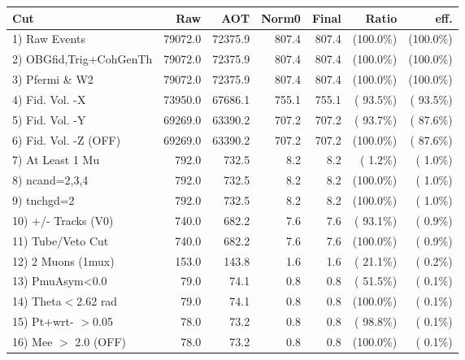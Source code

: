  \begin{table}[h!]\centering
 \begin{tabular}{||l||r|r|r|r|r|r||}
 \hline
 \hline
 Cut & Raw & AOT & Norm0 & Final & Ratio & eff.       \\
 \hline
  1) Raw Events           &      79072.0 &      72375.9 &        807.4 &        807.4 & (100.0\%) & (100.0\%) \\
  2) OBGfid,Trig+CohGenTh &      79072.0 &      72375.9 &        807.4 &        807.4 & (100.0\%) & (100.0\%) \\
  3) Pfermi \& W2         &      79072.0 &      72375.9 &        807.4 &        807.4 & (100.0\%) & (100.0\%) \\
  4) Fid. Vol. -X         &      73950.0 &      67686.1 &        755.1 &        755.1 & ( 93.5\%) & ( 93.5\%) \\
  5) Fid. Vol. -Y         &      69269.0 &      63390.2 &        707.2 &        707.2 & ( 93.7\%) & ( 87.6\%) \\
  6) Fid. Vol. -Z (OFF)   &      69269.0 &      63390.2 &        707.2 &        707.2 & (100.0\%) & ( 87.6\%) \\
  7) At Least 1 Mu        &        792.0 &        732.5 &          8.2 &          8.2 & (  1.2\%) & (  1.0\%) \\
  8) ncand=2,3,4          &        792.0 &        732.5 &          8.2 &          8.2 & (100.0\%) & (  1.0\%) \\
  9) tnchgd=2             &        792.0 &        732.5 &          8.2 &          8.2 & (100.0\%) & (  1.0\%) \\
 10) +/- Tracks (V0)      &        740.0 &        682.2 &          7.6 &          7.6 & ( 93.1\%) & (  0.9\%) \\
 11) Tube/Veto Cut        &        740.0 &        682.2 &          7.6 &          7.6 & (100.0\%) & (  0.9\%) \\
 12) 2 Muons (1mux)       &        153.0 &        143.8 &          1.6 &          1.6 & ( 21.1\%) & (  0.2\%) \\
 13) PmuAsym<0.0          &         79.0 &         74.1 &          0.8 &          0.8 & ( 51.5\%) & (  0.1\%) \\
 14) Theta$<$2.62 rad     &         79.0 &         74.1 &          0.8 &          0.8 & (100.0\%) & (  0.1\%) \\
 15) Pt+wrt- $>$0.05      &         78.0 &         73.2 &          0.8 &          0.8 & ( 98.8\%) & (  0.1\%) \\
 16) Mee $>$ 2.0  (OFF)   &         78.0 &         73.2 &          0.8 &          0.8 & (100.0\%) & (  0.1\%) \\

\end{tabular}
\end{table}
